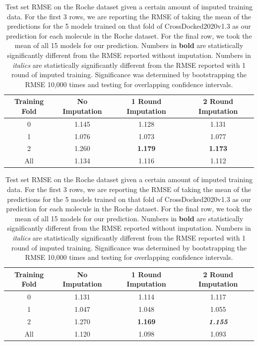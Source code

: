 \documentclass[journal=jcim,manuscript=article]{achemso}
\begin{document}
\begin{table}
    \begin{subtable}[h]{0.95\textwidth}
        \centering
        \begin{tabular}{c|c|c|c}
            Training Fold & No Imputation & 1 Round Imputation & 2 Round Imputation \\
            \hline
           0 & 1.145 & 1.128 & 1.131 \\
           1 & 1.076 & 1.073 & 1.077 \\
           2 & 1.260 & \textbf{1.179} & \textbf{1.173} \\
            \hline
            \hline
           All & 1.134 & 1.116 & 1.112 \\
            \hline
        \end{tabular}
    \caption{Performance on gnina docked poses of the Roche dataset.}
    \end{subtable}
    \hfill
    \begin{subtable}[h]{0.95\textwidth}
        \centering
        \begin{tabular}{c|c|c|c}
            Training Fold & No Imputation & 1 Round Imputation & 2 Round Imputation \\
            \hline
           0 & 1.131 & 1.114 & 1.117 \\
           1 & 1.047 & 1.048 & 1.055 \\
           2 & 1.270 & \textbf{1.169} & \textbf{\textit{1.155}} \\
           \hline
           \hline
           All & 1.120 & 1.098 & 1.093 \\
           \hline
           \end{tabular}
       \caption{Performance on the pose provided by the Roche dataset}
    \end{subtable}
    \caption{Test set RMSE on the Roche dataset given a certain amount of imputed training data. For the first 3 rows, we are reporting the RMSE of taking the mean of the predictions for the 5 models trained on that fold of CrossDocked2020v1.3 as our prediction for each molecule in the Roche dataset. For the final row, we took the mean of all 15 models for our prediction. Numbers in \textbf{bold} are statistically significantly different from the RMSE reported without imputation. Numbers in \textit{italics} are statistically significantly different from the RMSE reported with 1 round of imputed training. Significance was determined by bootstrapping the RMSE 10,000 times and testing for overlapping confidence intervals.}
    \label{tab:roche}
\end{table}
\end{document}
